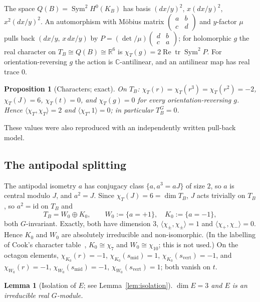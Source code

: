 \documentclass[11pt]{amsart}
\newtheorem{proposition}[theorem]{Proposition}
\newtheorem{lemma}[theorem]{Lemma}
\theoremstyle{definition}
\theoremstyle{remark}
\newcommand{\R}{\mathbb{R}}
\newcommand{\C}{\mathbb{C}}
\newcommand{\Sym}{\operatorname{Sym}}
\newcommand{\tr}{\operatorname{tr}}
\newcommand{\smid}{s_{\mathrm{mid}}}
\newcommand{\svert}{s_{\mathrm{vert}}}
\begin{document}
The space $Q(B)=\Sym^2H^0(K_B)$ has basis $(dx/y)^2$, $x(dx/y)^2$, $x^2(dx/y)^2$. An automorphism
with M\"obius matrix $\left(\begin{smallmatrix}a&b\\c&d\end{smallmatrix}\right)$ and $y$-factor $\mu$ pulls back
$(dx/y,\,x\,dx/y)$ by $P=(\det/\mu)\left(\begin{smallmatrix}d&b\\c&a\end{smallmatrix}\right)$; for
holomorphic $g$ the real character on $T_B\cong Q(B)\cong\R^6$ is $\chi_T(g)=2\operatorname{Re}\tr\Sym^2P$.
For orientation-reversing $g$ the action is $\C$-antilinear, and an antilinear map has real trace
$0$.

\begin{proposition}[Characters; exact]\label{prop:chars}
On $T_B$:
$\chi_T(r)=\chi_T(r^3)=\chi_T(r^2)=-2$, $\chi_T(J)=6$, $\chi_T(t)=0$, and $\chi_T(g)=0$ for every
orientation-reversing $g$. Hence $\langle\chi_T,\chi_T\rangle=2$ and $\langle\chi_T,1\rangle=0$; in
particular $T_B^G=0$.
\end{proposition}

These values were also reproduced with an independently written pull-back model.

\subsection{The antipodal splitting}
The antipodal isometry $a$ has conjugacy class $\{a,a^3=aJ\}$ of size $2$, so $a$ is central modulo
$J$, and $a^2=J$. Since $\chi_T(J)=6=\dim T_B$, $J$ acts trivially on $T_B$, so $a^2=\mathrm{id}$ on
$T_B$ and
\[
T_B=W_0\oplus K_0,\qquad W_0:=\{a=+1\},\quad K_0:=\{a=-1\},
\]
both $G$-invariant. Exactly, both have dimension $3$, $\langle\chi_\pm,\chi_\pm\rangle=1$ and
$\langle\chi_+,\chi_-\rangle=0$. Hence $K_0$ and $W_0$ are absolutely irreducible and
non-isomorphic. (In the labelling of Cook's character table~\cite[App.~A]{Coo18},
$K_0\cong\chi_7$ and $W_0\cong\chi_{10}$; this is not used.) On the octagon elements,
$\chi_{K_0}(r)=-1$, $\chi_{K_0}(\smid)=1$, $\chi_{K_0}(\svert)=-1$, and
$\chi_{W_0}(r)=-1$, $\chi_{W_0}(\smid)=-1$, $\chi_{W_0}(\svert)=1$; both vanish on $t$.

\begin{lemma}[Isolation of $E$; see Lemma~\ref{lem:isolation}]
$\dim E=3$ and $E$ is an irreducible real $G$-module.
\end{lemma}
\end{document}
